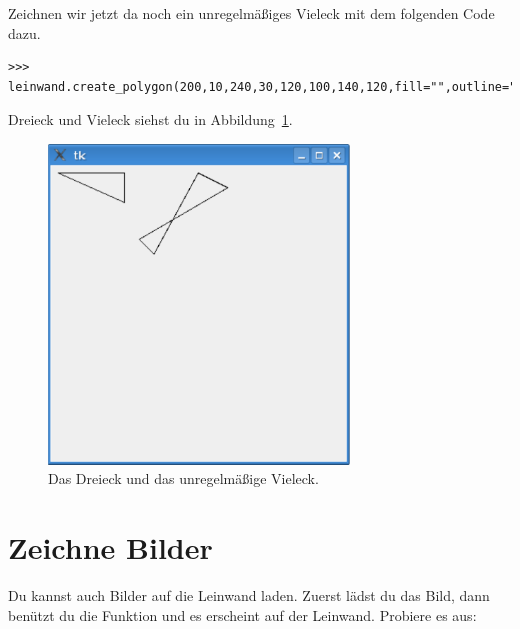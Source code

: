 Zeichnen wir jetzt da noch ein unregelmäßiges Vieleck mit dem folgenden Code dazu.

\begin{Verbatim}[frame=single]
>>> leinwand.create_polygon(200,10,240,30,120,100,140,120,fill="",outline="black")
\end{Verbatim}

Dreieck und Vieleck siehst du in Abbildung~\ref{fig42}.

\begin{figure}
\begin{center}
\includegraphics[width=80mm]{images/figure42}
\end{center}
\caption{Das Dreieck und das unregelmäßige Vieleck.}\label{fig42}
\end{figure}

\section{Zeichne Bilder}
Du kannst auch Bilder auf die Leinwand laden. Zuerst lädst du das Bild, dann benützt du die Funktion  und es erscheint auf der Leinwand. Probiere es aus:

